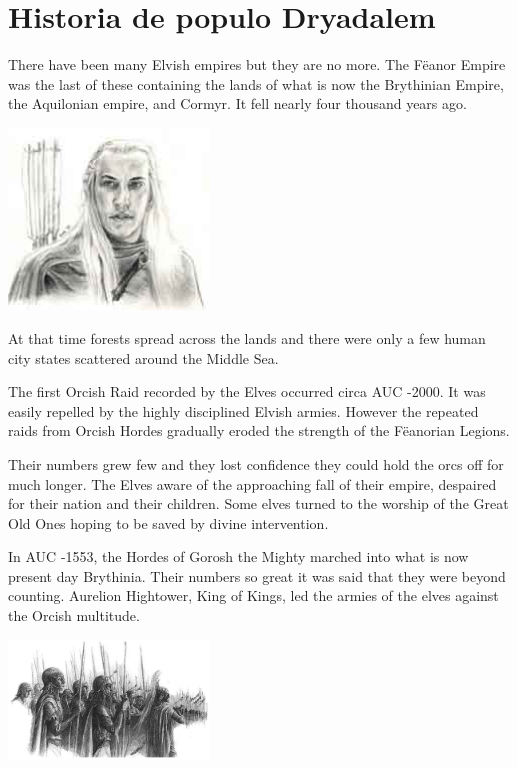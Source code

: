 \documentclass[a4paper]{dnd5}
\begin{document}
\section*{Historia de populo Dryadalem}

There have been many Elvish empires but they are no more.   The Fëanor Empire was the last of these containing the lands of what is now the Brythinian Empire, the Aquilonian empire, and Cormyr.  It fell nearly four thousand years ago.

 \includegraphics[width=0.4\textwidth]{elf.jpeg}

At that time forests spread across the lands and there were only a few human city states scattered around the Middle Sea.

The first Orcish Raid recorded by the Elves occurred circa AUC -2000.  It was easily repelled by the highly disciplined Elvish armies.  However the repeated raids from Orcish Hordes gradually eroded the strength of the Fëanorian Legions.  

Their numbers grew few and they lost confidence they could hold the orcs off for much longer.  The Elves aware of the approaching fall of their empire, despaired for their nation and their children.  Some elves turned to the worship of the Great Old Ones hoping to be saved by divine intervention.


In AUC -1553, the Hordes of Gorosh the Mighty marched into what is now present day Brythinia.  Their numbers so great it was said that they were beyond counting.  Aurelion Hightower, King of Kings, led the armies of the elves against the Orcish multitude. 

 \includegraphics[width=0.4\textwidth]{legion.jpg}
\end{document}
